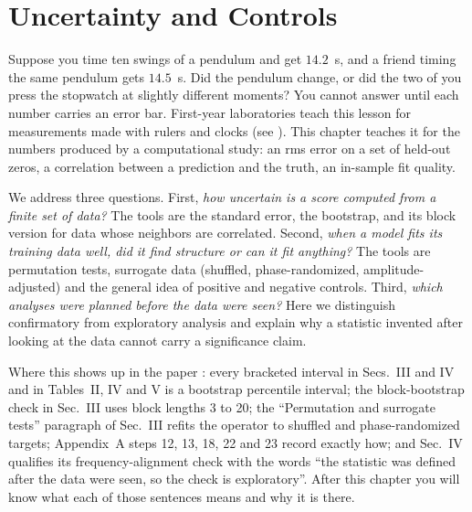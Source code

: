 \chapter{Uncertainty and Controls}\label{ch:controls}

\begin{chapterintro}
Suppose you time ten swings of a pendulum and get $14.2$~s, and a friend timing the same pendulum gets $14.5$~s. Did the pendulum change, or did the two of you press the stopwatch at slightly different moments? You cannot answer until each number carries an error bar. First-year laboratories teach this lesson for measurements made with rulers and clocks (see \cite{hrw}). This chapter teaches it for the numbers produced by a computational study: an rms error on a set of held-out zeros, a correlation between a prediction and the truth, an in-sample fit quality.

We address three questions. First, \emph{how uncertain is a score computed from a finite set of data?} The tools are the standard error, the bootstrap, and its block version for data whose neighbors are correlated. Second, \emph{when a model fits its training data well, did it find structure or can it fit anything?} The tools are permutation tests, surrogate data (shuffled, phase-randomized, amplitude-adjusted) and the general idea of positive and negative controls. Third, \emph{which analyses were planned before the data were seen?} Here we distinguish confirmatory from exploratory analysis and explain why a statistic invented after looking at the data cannot carry a significance claim.

Where this shows up in the paper \cite{soniR1}: every bracketed interval in Secs.~III and IV and in Tables~II, IV and V is a bootstrap percentile interval; the block-bootstrap check in Sec.~III uses block lengths 3 to 20; the ``Permutation and surrogate tests'' paragraph of Sec.~III refits the operator to shuffled and phase-randomized targets; Appendix~A steps 12, 13, 18, 22 and 23 record exactly how; and Sec.~IV qualifies its frequency-alignment check with the words ``the statistic was defined after the data were seen, so the check is exploratory''. After this chapter you will know what each of those sentences means and why it is there.
\end{chapterintro}

